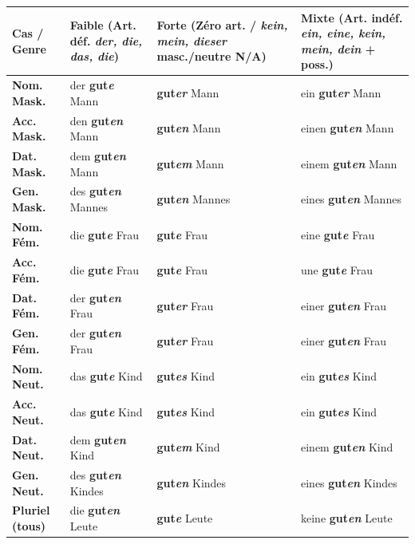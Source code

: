 \documentclass[11pt]{article}
\begin{document}
\begin{center}
\begin{tabularx}{\linewidth}{|X|X|X|X|}
\hline
\rowcolor{popblueL} \textbf{Cas / Genre} & \textbf{Faible (Art. déf. \textit{der, die, das, die})} & \textbf{Forte (Zéro art. / \textit{kein, mein, dieser} masc./neutre N/A)} & \textbf{Mixte (Art. indéf. \textit{ein, eine, kein, mein, dein} + poss.)} \\ \hline
\textbf{Nom. Mask.} & der \textbf{gut\emph{e}} Mann & \textbf{gut\emph{er}} Mann & ein \textbf{gut\emph{er}} Mann \\ \hline
\textbf{Acc. Mask.} & den \textbf{gut\emph{en}} Mann & \textbf{gut\emph{en}} Mann & einen \textbf{gut\emph{en}} Mann \\ \hline
\textbf{Dat. Mask.} & dem \textbf{gut\emph{en}} Mann & \textbf{gut\emph{em}} Mann & einem \textbf{gut\emph{en}} Mann \\ \hline
\textbf{Gen. Mask.} & des \textbf{gut\emph{en}} Mannes & \textbf{gut\emph{en}} Mannes & eines \textbf{gut\emph{en}} Mannes \\ \hline
\textbf{Nom. Fém.} & die \textbf{gut\emph{e}} Frau & \textbf{gut\emph{e}} Frau & eine \textbf{gut\emph{e}} Frau \\ \hline
\textbf{Acc. Fém.} & die \textbf{gut\emph{e}} Frau & \textbf{gut\emph{e}} Frau & une \textbf{gut\emph{e}} Frau \\ \hline
\textbf{Dat. Fém.} & der \textbf{gut\emph{en}} Frau & \textbf{gut\emph{er}} Frau & einer \textbf{gut\emph{en}} Frau \\ \hline
\textbf{Gen. Fém.} & der \textbf{gut\emph{en}} Frau & \textbf{gut\emph{er}} Frau & einer \textbf{gut\emph{en}} Frau \\ \hline
\textbf{Nom. Neut.} & das \textbf{gut\emph{e}} Kind & \textbf{gut\emph{es}} Kind & ein \textbf{gut\emph{es}} Kind \\ \hline
\textbf{Acc. Neut.} & das \textbf{gut\emph{e}} Kind & \textbf{gut\emph{es}} Kind & ein \textbf{gut\emph{es}} Kind \\ \hline
\textbf{Dat. Neut.} & dem \textbf{gut\emph{en}} Kind & \textbf{gut\emph{em}} Kind & einem \textbf{gut\emph{en}} Kind \\ \hline
\textbf{Gen. Neut.} & des \textbf{gut\emph{en}} Kindes & \textbf{gut\emph{en}} Kindes & eines \textbf{gut\emph{en}} Kindes \\ \hline
\textbf{Pluriel (tous)} & die \textbf{gut\emph{en}} Leute & \textbf{gut\emph{e}} Leute & keine \textbf{gut\emph{en}} Leute \\ \hline
\end{tabularx}
\end{center}
\end{document}
